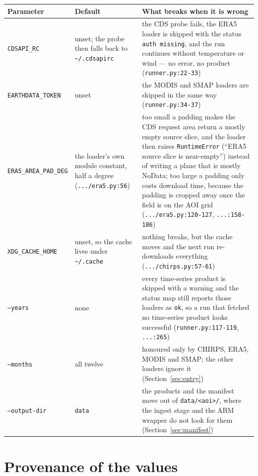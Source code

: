 \documentclass[11pt,a4paper]{article}
\newcommand{\code}[1]{\texttt{#1}}
\begin{document}
\small
\begin{longtable}{@{}p{2.6cm}p{3.6cm}p{}@{}}
\toprule
Parameter & Default & What breaks when it is wrong \\
\midrule
\endhead
\code{CDSAPI\_RC} & unset; the probe then falls back to
\code{\textasciitilde/.cdsapirc} & the CDS probe fails, the ERA5 loader is
skipped with the status \code{auth missing}, and the run continues without
temperature or wind --- no error, no product
(\code{runner.py:22-33}) \\
\code{EARTHDATA\_TOKEN} & unset & the MODIS and SMAP loaders are skipped in
the same way (\code{runner.py:34-37}) \\
\code{ERA5\_AREA\_PAD\_DEG} & the loader's own module constant, half a
degree (\code{.../era5.py:56}) & too small a padding makes the CDS request
area return a mostly empty source slice, and the loader then raises
\code{RuntimeError} (``ERA5 source slice is near-empty'') instead of
writing a plane that is mostly NoData; too large a padding only costs
download time, because the padding is cropped away once the field is on the
AOI grid (\code{.../era5.py:120-127}, \code{...:158-186}) \\
\code{XDG\_CACHE\_HOME} & unset, so the cache lives under
\code{\textasciitilde/.cache} & nothing breaks, but the cache moves and the
next run re-downloads everything
(\code{.../chirps.py:57-61}) \\
\code{--years} & none & every time-series product is skipped with a warning
and the status map still reports those loaders as \code{ok}, so a run that
fetched no time-series product looks successful
(\code{runner.py:117-119}, \code{...:265}) \\
\code{--months} & all twelve & honoured only by CHIRPS, ERA5, MODIS and
SMAP; the other loaders ignore it (Section~\ref{sec:entry}) \\
\code{--output-dir} & \code{data} & the products and the manifest move out
of \code{data/<aoi>/}, where the ingest stage and the ABM wrapper do not look
for them (Section~\ref{sec:manifest}) \\
\bottomrule
\end{longtable}
\normalsize
\label{tab:parameters}

\section{Provenance of the values}
\label{sec:provenance}
\end{document}
